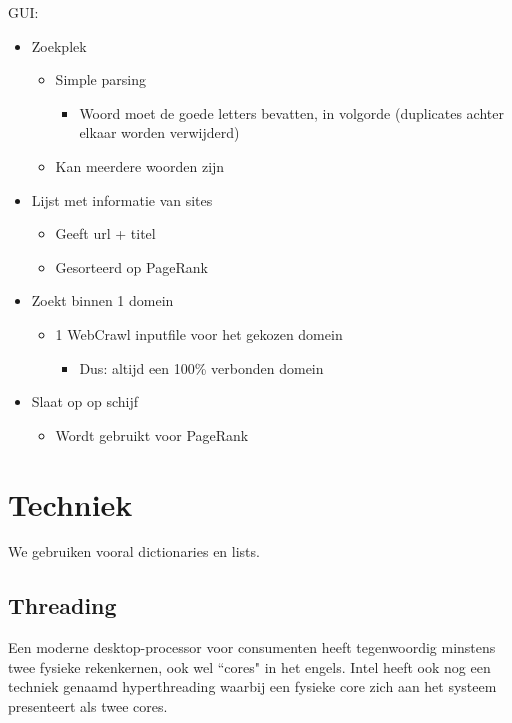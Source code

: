 \documentclass[12pt,a4paper]{article}
\begin{document}
GUI:
\begin{itemize}
\item Zoekplek
\begin{itemize}
\item Simple parsing
\begin{itemize}
\item Woord moet de goede letters bevatten, in volgorde (duplicates achter elkaar worden verwijderd)
\end{itemize}
\item Kan meerdere woorden zijn
\end{itemize}
\item Lijst met informatie van sites
\begin{itemize}
\item Geeft url + titel
\item Gesorteerd op PageRank
\end{itemize}
\end{itemize}

\begin{itemize}
\item Zoekt binnen 1 domein
\begin{itemize}
\item 1 WebCrawl inputfile voor het gekozen domein
\begin{itemize}
\item Dus: altijd een 100\% verbonden domein
\end{itemize}
\end{itemize}
\item Slaat op op schijf
\begin{itemize}
\item Wordt gebruikt voor PageRank
\end{itemize}
\end{itemize}

\section{Techniek}
We gebruiken vooral dictionaries en lists.
\subsection{Threading}
Een moderne desktop-processor voor consumenten heeft tegenwoordig minstens twee fysieke rekenkernen, ook wel ``cores" in het engels. Intel heeft ook nog een techniek genaamd hyperthreading waarbij een fysieke core zich aan het systeem presenteert als twee cores.
\clearpage
\end{document}
